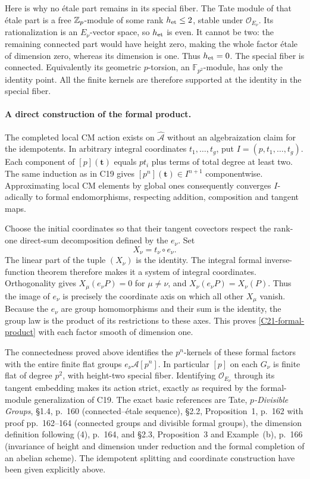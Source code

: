\documentclass[11pt]{article}
\theoremstyle{definition}\newtheorem{definition}[theorem]{Definition}\newtheorem{remark}[theorem]{Remark}
\begin{document}
Here is why no \'etale part remains in its special fiber.
The Tate module of that \'etale part is a free $\mathbb Z_p$-module
of some rank $h_{\rm et}\leq2$, stable under
$\mathcal O_{E_\nu}$.  Its rationalization is an
$E_\nu$-vector space, so $h_{\rm et}$ is even.
It cannot be two: the remaining connected part would have
height zero, making the whole factor \'etale of dimension
zero, whereas its dimension is one.  Thus $h_{\rm et}=0$.
The special fiber is connected.  Equivalently its geometric
$p$-torsion, an $\mathbb F_{p^2}$-module, has only the
identity point.  All the finite kernels are therefore supported
at the identity in the special fiber.

\paragraph{A direct construction of the formal product.}
The completed local CM action exists on
$\widehat{\mathcal A}$ without an algebraization claim for
the idempotents.  In arbitrary integral coordinates
$t_1,\ldots,t_g$, put $I=(p,t_1,\ldots,t_g)$.
Each component of $[p](\mathbf t)$ equals $pt_i$ plus
terms of total degree at least two.  The same induction as
in C19 gives $[p^n](\mathbf t)\in I^{n+1}$ componentwise.
Approximating local CM elements by global ones consequently
converges $I$-adically to formal endomorphisms, respecting
addition, composition and tangent maps.

Choose the initial coordinates so that their tangent
covectors respect the rank-one direct-sum decomposition
defined by the $e_\nu$.  Set
\[
 X_\nu=t_\nu\circ e_\nu.
\]
The linear part of the tuple $(X_\nu)$ is the identity.
The integral formal inverse-function theorem therefore makes
it a system of integral coordinates.  Orthogonality gives
$X_\mu(e_\nu P)=0$ for $\mu\ne\nu$, and
$X_\nu(e_\nu P)=X_\nu(P)$.
Thus the image of $e_\nu$ is precisely the coordinate axis
on which all other $X_\mu$ vanish.  Because the $e_\nu$ are
group homomorphisms and their sum is the identity, the group
law is the product of its restrictions to these axes.
This proves \eqref{C21-formal-product} with each factor
smooth of dimension one.

The connectedness proved above identifies the $p^n$-kernels
of these formal factors with the entire finite flat groups
$e_\nu\mathcal A[p^n]$.  In particular $[p]$ on each
$G_\nu$ is finite flat of degree $p^2$, with height-two
special fiber.  Identifying $\mathcal O_{E_\nu}$ through
its tangent embedding makes its action strict, exactly as
required by the formal-module generalization of C19.
The exact basic references are Tate, \emph{$p$-Divisible
Groups}, \S1.4, p.~160 (connected--\'etale sequence),
\S2.2, Proposition~1, p.~162 with proof pp.~162--164
(connected groups and divisible formal groups), the
dimension definition following (4), p.~164, and
\S2.3, Proposition~3 and Example~(b), p.~166
(invariance of height and dimension under reduction and
the formal completion of an abelian scheme).
The idempotent splitting and coordinate construction have
been given explicitly above.
\end{document}
